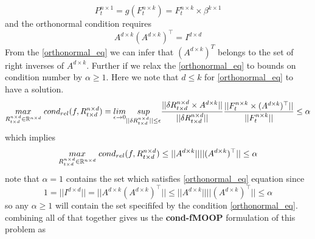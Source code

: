 \begin{equation} \label{g_for_lfm}
P^{n \times 1}_{t} = g(F^{n\times k}_t) = F^{n\times k}_t \times \beta^{k \times 1}
\end{equation}
\newline
and the orthonormal condition requires
\begin{equation} \label{orthonormal_eq}
 A^{d\times k}(A^{d\times k})^{\top} = I^{d\times d}
\end{equation}
\newline
From the \ref{orthonormal_eq} we can infer that $(A^{d\times k})^T$ belongs to the set of right inverses of $A^{d\times k}$. \newline Further if we relax the \ref{orthonormal_eq} to bounds on condition number by $\alpha \ge 1$. Here we note that $d\le k$ for \ref{orthonormal_eq} to have a solution.
\begin{equation}
    \underset{R^{n\times d}_{t\times d} \in \mathbb{R}^{n\times d}}{max}\hspace{1mm} cond_{rel}(f,R^{n\times d}_{t\times d}) = \underset{\epsilon \to 0}{lim}\underset{||\delta R^{n\times d}_{t\times d}||\le \epsilon}{sup} \frac{||\delta R^{n\times d}_{t\times d}\times A^{d\times k}||}{||\delta R^{n\times d}_{t\times d}||}  \frac{||F^{n\times k}_t \times (A^{d\times k})^{\top} ||}{|| F^{n\times k}_t||}\le \alpha
\end{equation}
which implies\newline
\begin{equation}
    \underset{R^{n\times d}_{t\times d} \in \mathbb{R}^{n\times d}}{max}\hspace{1mm} cond_{rel}(f,R^{n\times d}_{t\times d}) \le ||A^{d\times k}|| ||(A^{d\times k})^{\top} ||\le \alpha
\end{equation}
\newline
note that $\alpha=1$ contains the set which satisfies \ref{orthonormal_eq} equation since 
\begin{equation}
1= || I^{d\times d}||= || A^{d\times k}(A^{d\times k})^{\top} ||  \le || A^{d\times k}||||(A^{d\times k})^{\top} || \le \alpha
\end{equation}\newline
so any $\alpha \ge 1$ will contain the set specififed by the condition \ref{orthonormal_eq}. \newline
combining all of that together gives us the \textbf{cond-fMOOP} formulation of this problem as

